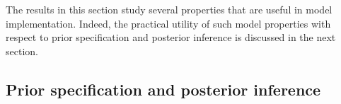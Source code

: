 

%
%

The results in this section study several properties that are useful in model
implementation. Indeed, the practical utility of such model properties with respect 
to prior specification and posterior inference is discussed in the next section.




\subsection{Prior specification and posterior inference}
\label{subsec:modelapply}


